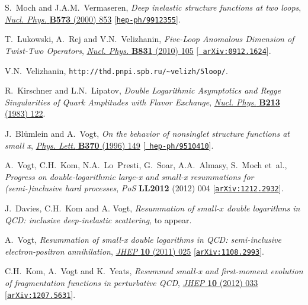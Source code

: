 \documentclass[12pt]{article}
\begin{document}
{\begin{thebibliography}{100}
S.~Moch and J.A.M.~Vermaseren, \emph{{Deep inelastic structure functions at two
  loops}}, \href{https://dx.doi.org/10.1016/S0550-3213(00)00045-6}{\emph{Nucl.
  Phys.} {\bf B573} (2000) 853}
  [\href{https://arxiv.org/abs/hep-ph/9912355}{{\tt hep-ph/9912355}}].

T.~Lukowski, A.~Rej and V.N.~Velizhanin, \emph{{Five-Loop Anomalous Dimension
  of Twist-Two Operators}},
  \href{https://dx.doi.org/10.1016/j.nuclphysb.2010.01.008}{\emph{Nucl. Phys.}
  {\bf B831} (2010) 105} [\href{https://arxiv.org/abs/0912.1624}{{\tt
  arXiv:0912.1624}}].

V.N.~Velizhanin, 
{\tt http://thd.pnpi.spb.ru/\textasciitilde{}velizh/5loop/}.

R.~Kirschner and L.N.~Lipatov, \emph{{Double Logarithmic Asymptotics and Regge
  Singularities of Quark Amplitudes with Flavor Exchange}},
  \href{https://dx.doi.org/10.1016/0550-3213(83)90178-5}{\emph{Nucl. Phys.}
  {\bf B213} (1983) 122}.

J.~Bl{\"u}mlein and A.~Vogt, \emph{{On the behavior of nonsinglet structure
  functions at small x}},
  \href{https://dx.doi.org/10.1016/0370-2693(95)01568-X}{\emph{Phys. Lett.}
  {\bf B370} (1996) 149} [\href{https://arxiv.org/abs/hep-ph/9510410}{{\tt
  hep-ph/9510410}}].

A.~Vogt, C.H.~Kom, N.A.~Lo~Presti, G.~Soar, A.A.~Almasy, S.~Moch et~al.,
  \emph{{Progress on double-logarithmic large-x and small-x resummations for
  (semi-)inclusive hard processes}}, {\emph{PoS} {\bf LL2012} (2012) 004}
  [\href{https://arxiv.org/abs/1212.2932}{{\tt arXiv:1212.2932}}].

J.~Davies, C.H.~Kom and A. Vogt,
{\it Resummation of small-$x$ double logarithms in QCD: inclusive 
 deep-inelastic scattering}, to appear.

A.~Vogt, \emph{{Resummation of small-x double logarithms in QCD: semi-inclusive
  electron-positron annihilation}},
  \href{https://dx.doi.org/10.1007/JHEP10(2011)025}{\emph{JHEP} {\bf 10} (2011)
  025} [\href{https://arxiv.org/abs/1108.2993}{{\tt arXiv:1108.2993}}].

C.H.~Kom, A.~Vogt and K.~Yeats, \emph{{Resummed small-x and first-moment
  evolution of fragmentation functions in perturbative QCD}},
  \href{https://dx.doi.org/10.1007/JHEP10(2012)033}{\emph{JHEP} {\bf 10} (2012)
  033} [\href{https://arxiv.org/abs/1207.5631}{{\tt arXiv:1207.5631}}].


\end{thebibliography}}
\end{document}

